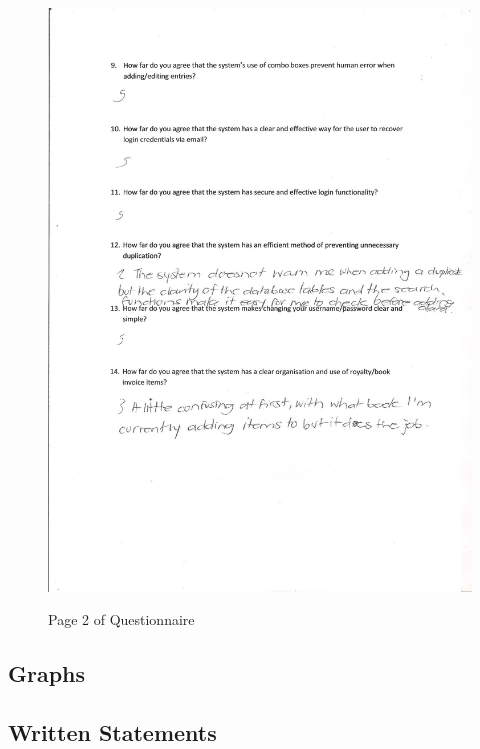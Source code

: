 \begin{figure}[H]
    \includegraphics[width=\textwidth]{./Evaluation/Questionnaire2.png}
    \label{fig:QuestionnairePage2} \caption{Page 2 of Questionnaire}
\end{figure}

\subsection{Graphs}

\subsection{Written Statements}
